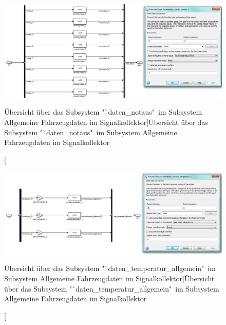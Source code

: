 \documentclass[fontsize = 12pt, paper = a4]{scrreprt}
\begin{document}
\newpage

\begin{figure}
\centering
\includegraphics[scale = 0.65]{sc_daten_notaus}
\caption[Übersicht über das Subsystem "`daten\_notaus"\ im Subsystem Allgemeine Fahrzeugdaten im Signalkollektor]{Übersicht über das Subsystem "`daten\_notaus"\ im Subsystem Allgemeine Fahrzeugdaten im Signalkollektor}
\label{scdatennotaus}
\end{figure}

\newpage

\begin{figure}
\centering
\includegraphics[scale = 0.65]{sc_daten_temperatur_allgemein}
\caption[Übersicht über das Subsystem "`daten\_temperatur\_allgemein"\ im Subsystem Allgemeine Fahrzeugdaten im Signalkollektor]{Übersicht über das Subsystem "`daten\_temperatur\_allgemein"\ im Subsystem Allgemeine Fahrzeugdaten im Signalkollektor}
\label{scdatentemperaturallgemein}
\end{figure}

\newpage
\end{document}
